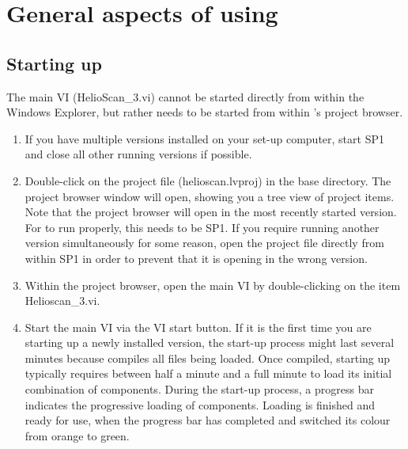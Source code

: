 \chapter{General aspects of using \HS}

\section{Starting up \HS}\label{sec:using_startingUpHS}
The \HS main \ac{VI} (HelioScan_3.vi) cannot be started directly from within the Windows Explorer, but rather needs to be started from within \HS's \LV project browser. 
\begin{enumerate}
	\item If you have multiple \LV versions installed on your set-up computer, start  SP1 and close all other running \LV versions if possible. 
	\item Double-click on the \HS project file (helioscan.lvproj) in the \HS base directory. The \LV project browser window will open, showing you a tree view of project items. Note that the project browser will open in the most recently started \LV version. For \HS to run properly, this needs to be  SP1. If you require running another \LV version simultaneously for some reason, open the \HS project file directly from within  SP1 in order to prevent that it is opening in the wrong \LV version. 
	\item Within the project browser, open the \HS main \ac{VI} by double-clicking on the item Helioscan_3.vi.
	\item Start the \HS main \ac{VI} via the \ac{VI} start button. If it is the first time you are starting up a newly installed \HS version, the start-up process might last several minutes because \LV compiles all \HS files being loaded. Once compiled, starting up \HS typically requires between half a minute and a full minute to load its initial combination of components. During the start-up process, a progress bar indicates the progressive loading of components. Loading is finished and \HS ready for use, when the progress bar has completed and switched its colour from orange to green. 
\end{enumerate}


